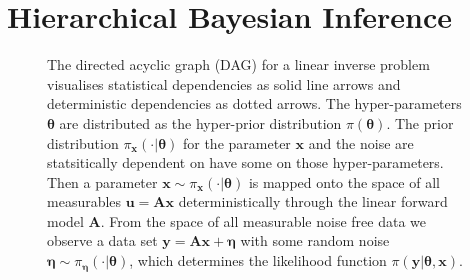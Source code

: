 \section{Hierarchical Bayesian Inference}
\label{sec:bayes}
\begin{figure}[ht!]
	\centering
	\caption[Bayesian Inference DAG]{The directed acyclic graph (DAG) for a linear inverse problem visualises statistical dependencies as solid line arrows and deterministic dependencies as dotted arrows.
	The hyper-parameters $\bm{\theta}$ are distributed as the hyper-prior distribution $\pi(\bm{\theta})$.
	The prior distribution $ \pi_{\bm{x}}(\cdot|\bm{\theta})$ for the parameter $\bm{x}$ and the noise are statsitically dependent on have some on those hyper-parameters.
	 Then a parameter $\bm{x} \sim \pi_{\bm{x}}(\cdot|\bm{\theta})$ is mapped onto the space of all measurables $\bm{u}=\bm{Ax}$ deterministically through the linear forward model $\bm{A}$.
	From the space of all measurable noise free data we observe a data set $\bm{y} = \bm{Ax} + \bm{\eta}$ with some random noise $ \bm{\eta} \sim \pi_{\bm{\eta}}(\cdot|\bm{\theta})$, which determines the likelihood function $\pi(\bm{y}|\bm{\theta}, \bm{x})$. }
	\label{fig:FirstDAG}
\end{figure}

